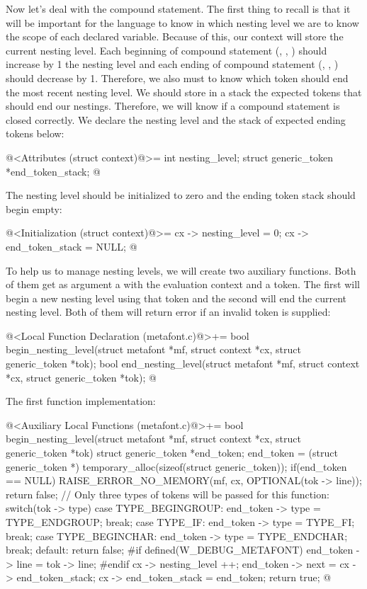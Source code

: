 Now let's deal with the compound statement. The first thing to recall
is that it will be important for the language to know in which nesting
level we are to know the scope of each declared variable. Because of
this, our context will store the current nesting level. Each beginning
of compound statement
(, , )
should increase by 1 the nesting level and each ending of compound
statement
(, , ) should
decrease by 1. Therefore, we also must to know which token should end
the most recent nesting level. We should store in a stack the expected
tokens that should end our nestings. Therefore, we will know if a
compound statement is closed correctly. We declare the nesting level
and the stack of expected ending tokens below:

\iniciocodigo
@<Attributes (struct context)@>=
  int nesting_level;
  struct generic_token *end_token_stack;
@
\fimcodigo

The nesting level should be initialized to zero and the ending token
stack should begin empty:

\iniciocodigo
@<Initialization (struct context)@>=
  cx -> nesting_level = 0;
  cx -> end_token_stack = NULL;
@
\fimcodigo

To help us to manage nesting levels, we will create two auxiliary
functions. Both of them get as argument a 
with the evaluation context and a token. The first will begin a new
nesting level using that token and the second will end the current
nesting level. Both of them will return error if an invalid token is
supplied:

\iniciocodigo
@<Local Function Declaration (metafont.c)@>+=
bool begin_nesting_level(struct metafont *mf, struct context *cx,
                         struct generic_token *tok);
bool end_nesting_level(struct metafont *mf, struct context *cx,
                       struct generic_token *tok);
@
\fimcodigo

The first function implementation:

\iniciocodigo
@<Auxiliary Local Functions (metafont.c)@>+=
bool begin_nesting_level(struct metafont *mf, struct context *cx,
                         struct generic_token *tok){
  struct generic_token *end_token;
  end_token = (struct generic_token *)
                    temporary_alloc(sizeof(struct generic_token));
  if(end_token == NULL){
    RAISE_ERROR_NO_MEMORY(mf, cx, OPTIONAL(tok -> line));
    return false;
  }
  // Only three types of tokens will be passed for this function:
  switch(tok -> type){
  case TYPE_BEGINGROUP:
    end_token -> type = TYPE_ENDGROUP;
    break;
  case TYPE_IF:
    end_token -> type = TYPE_FI;
    break;
  case TYPE_BEGINCHAR:
    end_token -> type = TYPE_ENDCHAR;
    break;
  default:
    return false;
  }
#if defined(W_DEBUG_METAFONT)
  end_token -> line = tok -> line;
#endif
  cx -> nesting_level ++;
  end_token -> next = cx -> end_token_stack;
  cx -> end_token_stack = end_token;
  return true;
}
@
\fimcodigo

